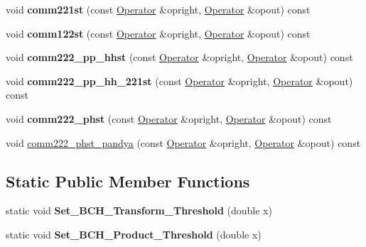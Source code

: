 \begin{DoxyCompactItemize}
\item 
\hypertarget{classOperator_af90f2d16ebea510ae97ae4bbf6363113}{void {\bfseries comm221st} (const \hyperlink{classOperator}{Operator} \&opright, \hyperlink{classOperator}{Operator} \&opout) const }\label{classOperator_af90f2d16ebea510ae97ae4bbf6363113}

\item 
\hypertarget{classOperator_a375a7289a8d39cb7354380a1714dee32}{void {\bfseries comm122st} (const \hyperlink{classOperator}{Operator} \&opright, \hyperlink{classOperator}{Operator} \&opout) const }\label{classOperator_a375a7289a8d39cb7354380a1714dee32}

\item 
\hypertarget{classOperator_aa49d442b8dc21367a8973bc9814f4c96}{void {\bfseries comm222\-\_\-pp\-\_\-hhst} (const \hyperlink{classOperator}{Operator} \&opright, \hyperlink{classOperator}{Operator} \&opout) const }\label{classOperator_aa49d442b8dc21367a8973bc9814f4c96}

\item 
\hypertarget{classOperator_a780b931a73017ffbc1a70e7c86ca8256}{void {\bfseries comm222\-\_\-pp\-\_\-hh\-\_\-221st} (const \hyperlink{classOperator}{Operator} \&opright, \hyperlink{classOperator}{Operator} \&opout) const }\label{classOperator_a780b931a73017ffbc1a70e7c86ca8256}

\item 
\hypertarget{classOperator_a3d6754f76f04eaddc92dbbc7bbf21caa}{void {\bfseries comm222\-\_\-phst} (const \hyperlink{classOperator}{Operator} \&opright, \hyperlink{classOperator}{Operator} \&opout) const }\label{classOperator_a3d6754f76f04eaddc92dbbc7bbf21caa}

\item 
void \hyperlink{classOperator_a86add7287c36700de1079e1f442b1e90}{comm222\-\_\-phst\-\_\-pandya} (const \hyperlink{classOperator}{Operator} \&opright, \hyperlink{classOperator}{Operator} \&opout) const 
\end{DoxyCompactItemize}
\subsection*{Static Public Member Functions}
\begin{DoxyCompactItemize}
\item 
\hypertarget{classOperator_a6f505221635444cb0b489b9ac600fd61}{static void {\bfseries Set\-\_\-\-B\-C\-H\-\_\-\-Transform\-\_\-\-Threshold} (double x)}\label{classOperator_a6f505221635444cb0b489b9ac600fd61}

\item 
\hypertarget{classOperator_a2c42843a1a557f2ab568d106e8fd23e8}{static void {\bfseries Set\-\_\-\-B\-C\-H\-\_\-\-Product\-\_\-\-Threshold} (double x)}\label{classOperator_a2c42843a1a557f2ab568d106e8fd23e8}

\end{DoxyCompactItemize}

